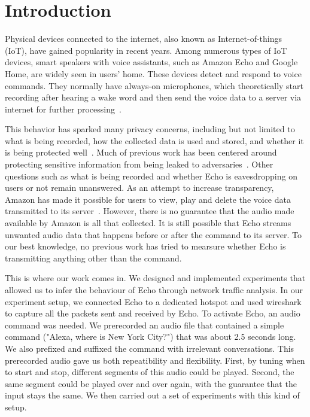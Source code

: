 \section{Introduction}
Physical devices connected to the internet, also known as Internet-of-things (IoT), have gained popularity in recent years. Among numerous types of IoT devices, smart speakers with voice assistants, such as Amazon Echo and Google Home, are widely seen in users' home. These devices detect and respond to voice commands. They normally have always-on microphones, which theoretically start recording after hearing a wake word and then send the voice data to a server via internet for further processing~\cite{AmazonEc68:online}.

This behavior has sparked many privacy concerns, including but not limited to what is being recorded, how the collected data is used and stored, and whether it is being protected well~\cite{lau2018alexa, fowler_2019, apthorpe2017smart, apthorpe2019keeping, apthorpe2017spying}. Much of previous work has been centered around protecting sensitive information from being leaked to adversaries~\cite{apthorpe2017smart, apthorpe2019keeping, apthorpe2017spying}. Other questions such as what is being recorded and whether Echo is eavesdropping on users or not remain unanswered. As an attempt to increase transparency, Amazon has made it possible for users to view, play and delete the voice data transmitted to its server~\cite{ford2019alexa}. However, there is no guarantee that the audio made available by Amazon is all that collected. It is still possible that Echo streams unwanted audio data that happens before or after the command to its server. To our best knowledge, no previous work has tried to mearsure whether Echo is transmitting anything other than the command.

This is where our work comes in. We designed and implemented experiments that allowed us to infer the behaviour of Echo through network traffic analysis. In our experiment setup, we connected Echo to a dedicated hotspot and used wireshark to capture all the packets sent and received by Echo. To activate Echo, an audio command was needed. We prerecorded an audio file that contained a simple command ("Alexa, where is New York City?") that was about 2.5 seconds long. We also prefixed and suffixed the command with irrelevant conversations. This prerecorded audio gave us both repeatibility and flexibility. First, by tuning when to start and stop, different segments of this audio could be played. Second, the same segment could be played over and over again, with the guarantee that the input stays the same. We then carried out a set of experiments with this kind of setup.

